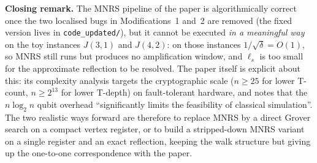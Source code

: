 \documentclass[11pt,a4paper]{article}
\begin{document}
\medskip
\noindent\textbf{Closing remark.} The MNRS pipeline of the paper is
algorithmically correct once the two localised bugs in
Modifications~1 and~2 are removed (the fixed version lives in
\texttt{code\_updated/}), but it cannot be executed \emph{in a
meaningful way} on the toy instances $J(3,1)$ and $J(4,2)$: on those
instances $1/\sqrt{\delta}=O(1)$, so MNRS still runs but produces no
amplification window, and $\ell_s$ is too small for the approximate
reflection to be resolved. The paper itself is explicit about this: its complexity
analysis targets the cryptographic scale ($n\ge 25$ for lower T-count,
$n\ge 2^{13}$ for lower T-depth) on fault-tolerant hardware, and notes
that the $n\log_2 n$ qubit overhead ``significantly limits the
feasibility of classical simulation''. The two realistic ways forward
are therefore to replace MNRS by a direct Grover search on a compact
vertex register, or to build a stripped-down MNRS variant on a single
register and an exact reflection, keeping the walk structure but
giving up the one-to-one correspondence with the paper.
\end{document}
